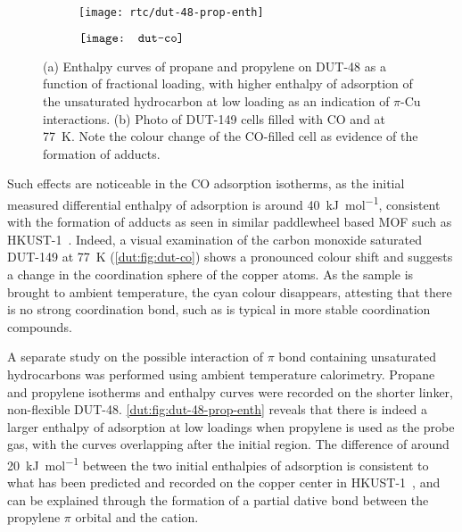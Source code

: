 \begin{figure}[htb]
    \centering
    \begin{subfigure}[c]{0.5\linewidth}
        \texttt{[image: rtc/dut-48-prop-enth]}%
        \caption{}\label{dut:fig:dut-48-prop-enth}
    \end{subfigure}%
    \begin{subfigure}[h]{0.5\linewidth}
        \centering
        \(\vcenter{\hbox{{\texttt{[image: dut-co]}}}}\)%
        \caption{}\label{dut:fig:dut-co}
    \end{subfigure}%
    \caption{(a) Enthalpy curves of propane and propylene on DUT-48 as 
    a function of fractional loading, with higher enthalpy of 
    adsorption of the unsaturated hydrocarbon at low loading as an 
    indication of \(\pi\)-Cu interactions. (b) Photo of DUT-149 cells
    filled with CO and  at \SI{77}{\kelvin}. Note the 
    colour change of the CO-filled cell as evidence of the formation of 
     adducts.}%
    \label{dut:fig:dut-48-prop}
\end{figure}

Such effects are noticeable in the CO adsorption isotherms, 
as the initial measured differential enthalpy of adsorption is around 
\SI{40}{\kilo\joule\per\mol}, consistent with the formation of 
 adducts as seen in similar paddlewheel based 
\gls{MOF} such as HKUST-1~\cite{prestipinoLocalStructureFramework2006}. 
Indeed, a visual examination of the carbon monoxide saturated 
DUT-149 at \SI{77}{\kelvin} 
(\autoref{dut:fig:dut-co}) shows a pronounced colour shift and 
suggests a change in the coordination sphere of the copper 
atoms. As the sample is brought to ambient temperature, the 
cyan colour disappears, attesting that there is no strong 
coordination bond, such as is typical in more stable 
 coordination compounds.

A separate study on the possible interaction of 
\(\pi\) bond containing unsaturated hydrocarbons was performed
using ambient temperature calorimetry. Propane and propylene 
isotherms and enthalpy curves were recorded on the shorter 
linker, non-flexible DUT-48. \autoref{dut:fig:dut-48-prop-enth}
reveals that there is indeed a larger enthalpy of adsorption
at low loadings when propylene is used as the probe gas, with 
the curves overlapping after the initial region. The difference 
of around \SI{20}{\kilo\joule\per\mol} between the two initial
enthalpies of adsorption is consistent to what has been predicted
and recorded on the copper center in 
HKUST-1~\cite{rubesAdsorptionPropanePropylene2013}, and can
be explained through the formation of a partial dative bond
between the propylene \(\pi\) orbital and the 
cation. 

